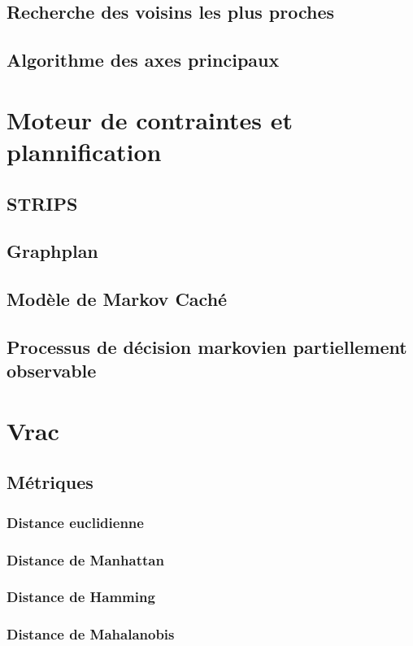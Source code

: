 \subsection{Recherche des voisins les plus proches}
\subsection{Algorithme des axes principaux}

\section{Moteur de contraintes et plannification}
\subsection{STRIPS}
\subsection{Graphplan}
\subsection{Modèle de Markov Caché}
\subsection{Processus de décision markovien partiellement observable}

\section{Vrac}
\subsection{Métriques}
\subsubsection{Distance euclidienne}
\subsubsection{Distance de Manhattan}
\subsubsection{Distance de Hamming}
\subsubsection{Distance de Mahalanobis}
